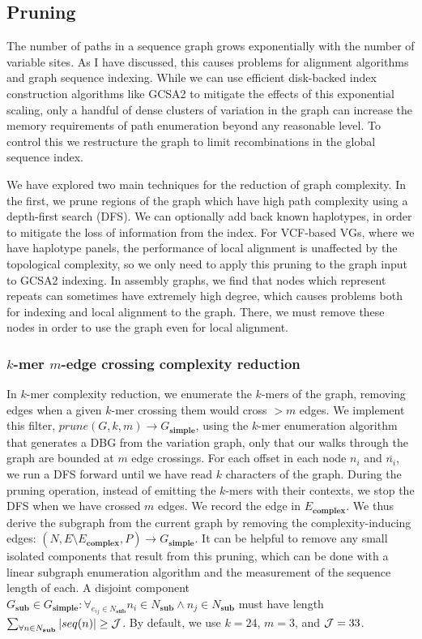 \subsection{Pruning}

The number of paths in a sequence graph grows exponentially with the number of variable sites.
As I have discussed, this causes problems for alignment algorithms and graph sequence indexing.
While we can use efficient disk-backed index construction algorithms like GCSA2 to mitigate the effects of this exponential scaling, only a handful of dense clusters of variation in the graph can increase the memory requirements of path enumeration beyond any reasonable level.
To control this we restructure the graph to limit recombinations in the global sequence index.

We have explored two main techniques for the reduction of graph complexity.
In the first, we prune regions of the graph which have high path complexity using a depth-first search (DFS).
We can optionally add back known haplotypes, in order to mitigate the loss of information from the index.
For VCF-based VGs, where we have haplotype panels, the performance of local alignment is unaffected by the topological complexity, so we only need to apply this pruning to the graph input to GCSA2 indexing.
In assembly graphs, we find that nodes which represent repeats can sometimes have extremely high degree, which causes problems both for indexing and local alignment to the graph.
There, we must remove these nodes in order to use the graph even for local alignment.

\subsubsection{$k$-mer $m$-edge crossing complexity reduction}

In $k$-mer complexity reduction, we enumerate the $k$-mers of the graph, removing edges when a given $k$-mer crossing them would cross $> m$ edges.
We implement this filter, $prune(G, k, m) \to G_\textbf{simple}$, using the $k$-mer enumeration algorithm that generates a DBG from the variation graph, only that our walks through the graph are bounded at $m$ edge crossings.
For each offset in each node $n_i$ and $\overline{n_i}$, we run a DFS forward until we have read $k$ characters of the graph.
During the pruning operation, instead of emitting the $k$-mers with their contexts, we stop the DFS when we have crossed $m$ edges.
We record the edge in $E_\textbf{complex}$. %
We thus derive the subgraph from the current graph by removing the complexity-inducing edges: $(N, E \setminus E_\textbf{complex}, P) \to G_\textbf{simple}$.
It can be helpful to remove any small isolated components that result from this pruning, which can be done with a linear subgraph enumeration algorithm and the measurement of the sequence length of each.
A disjoint component $G_\textbf{sub} \in G_\textbf{simple} : \forall_{e_{ij} \in N_\textbf{sub}} n_i \in N_\textbf{sub} \land n_j \in N_\textbf{sub}$ must have length $\sum_{\forall n \in N_\textbf{sub}} |seq(n)| \geq {\cal J}$.
By default, we use $k=24$, $m=3$, and ${\cal J}=33$.

